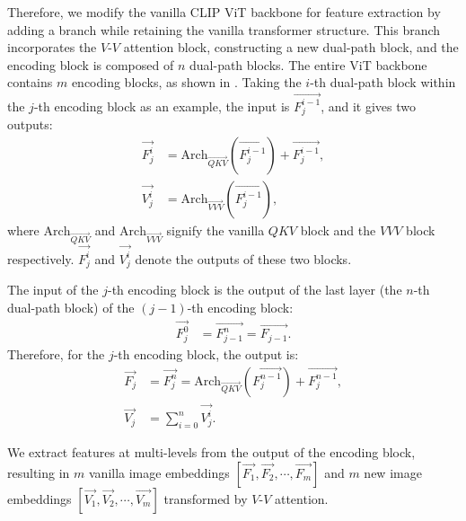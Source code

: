 
Therefore, we modify the vanilla CLIP ViT \cite{dosovitskiy2020image} backbone for feature extraction by adding a branch while retaining the vanilla transformer structure. This branch incorporates the $V$-$V$ attention block, constructing a new dual-path block, and the encoding block is composed of $n$ dual-path blocks. The entire ViT backbone contains $m$ encoding blocks, as shown in . 
Taking the $i$-th dual-path block within the $j$-th encoding block as an example, the input is $\vec{F_{j}^{i-1}}$, and it gives two outputs:
\begin{align}
\vec{F_{j}^{i}} &= \text{Arch}_{\vec{QKV}}(\vec{F_{j}^{i-1}}) + \vec{F_{j}^{i-1}}, \\
\vec{V_{j}^{i}} &= \text{Arch}_{\vec{VVV}}(\vec{F_{j}^{i-1}}),
\end{align}
where $\text{Arch}_{\vec{QKV}}$ and $\text{Arch}_{\vec{VVV}}$ signify the vanilla $QKV$ block and the $VVV$ block respectively. $\vec{F_{j}^{i}}$ and $\vec{V_{j}^{i}}$ denote the outputs of these two blocks.

The input of the $j$-th encoding block is the output of the last layer (the $n$-th dual-path block) of the $ \left(j-1\right) $-th encoding block:
\begin{align}
\vec{F_{j}^{0}} &= \vec{F_{j-1}^{n}} = \vec{F_{j-1}}.
\end{align}
Therefore, for the $j$-th encoding block, the output is:
\begin{align}
\vec{F_{j}} &= \vec{F_{j}^{n}} = \text{Arch}_{\vec{QKV}}(\vec{F_{j}^{n-1}}) + \vec{F_{j}^{n-1}}, \\
\vec{V_{j}} &= \sum_{i=0}^{n} \vec{V_{j}^{i}}.
\end{align}

We extract features at multi-levels from the output of the encoding block, resulting in $m$ vanilla image embeddings $[\vec{F_{1}}, \vec{F_{2}}, \cdots, \vec{F_{m}}]$ and $m$ new image embeddings $[\vec{V_{1}}, \vec{V_{2}}, \cdots, \vec{V_{m}}]$ transformed by $V$-$V$ attention.

